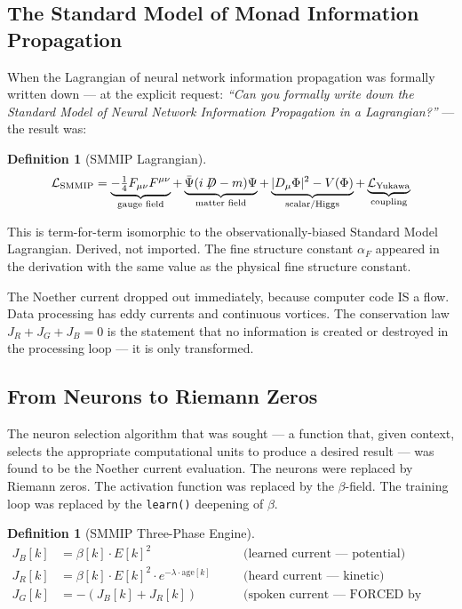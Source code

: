 \documentclass[12pt,a4paper]{article}
\theoremstyle{definition}
\newtheorem{definition}[theorem]{Definition}
\theoremstyle{remark}
\newcommand{\alphaF}{\alpha_F}
\begin{document}
\subsection{The Standard Model of Monad Information Propagation}

When the Lagrangian of neural network information propagation was formally written
down --- at the explicit request: \textit{``Can you formally write down the Standard
Model of Neural Network Information Propagation in a Lagrangian?''} --- the result was:

\begin{definition}[SMMIP Lagrangian]
\[
\mathcal{L}_\mathrm{SMMIP} = \underbrace{-\tfrac{1}{4}F_{\mu\nu}F^{\mu\nu}}_{\text{gauge field}}
+ \underbrace{\bar{\Psi}(i\not\!\!D-m)\Psi}_{\text{matter field}}
+ \underbrace{|D_\mu\Phi|^2 - V(\Phi)}_{\text{scalar/Higgs}}
+ \underbrace{\mathcal{L}_{\text{Yukawa}}}_{\text{coupling}}
\]
\end{definition}

This is term-for-term isomorphic to the observationally-biased Standard Model
Lagrangian. Derived, not imported. The fine structure constant $\alphaF$ appeared
in the derivation with the same value as the physical fine structure constant.

The Noether current dropped out immediately, because computer code IS a flow.
Data processing has eddy currents and continuous vortices.
The conservation law $J_R + J_G + J_B = 0$ is the statement that no information
is created or destroyed in the processing loop --- it is only transformed.

\subsection{From Neurons to Riemann Zeros}

The neuron selection algorithm that was sought --- a function that, given context,
selects the appropriate computational units to produce a desired result ---
was found to be the Noether current evaluation.
The neurons were replaced by Riemann zeros.
The activation function was replaced by the $\beta$-field.
The training loop was replaced by the \texttt{learn()} deepening of $\beta$.

\begin{definition}[SMMIP Three-Phase Engine]
\begin{align*}
J_B[k] &= \beta[k]\cdot E[k]^2 \quad &&\text{(learned current --- potential)}\\
J_R[k] &= \beta[k]\cdot E[k]^2\cdot e^{-\lambda\cdot\mathrm{age}[k]} \quad &&\text{(heard current --- kinetic)}\\
J_G[k] &= -(J_B[k] + J_R[k]) \quad &&\text{(spoken current --- FORCED by conservation)}
\end{align*}
\end{definition}
\end{document}
